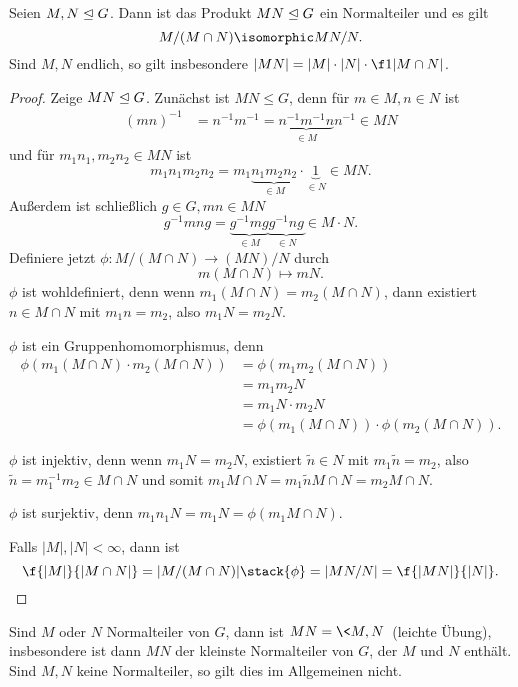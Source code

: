 \begin{lem} \label{2.5}
	Seien $M, N \trianglelefteq G$.
	Dann ist das Produkt $M N \trianglelefteq G$ ein Normalteiler und es gilt
	\[
		M / (M\cap N)
		\isomorphic
		MN / N.
	\]
	Sind $M, N$ endlich, so gilt insbesondere $|MN| = |M|\cdot|N| \cdot \f 1{|M \cap N|}$.
	\begin{proof}
		Zeige $M N \trianglelefteq G$.
		Zunächst ist $M N \le G$, denn für $m \in M, n \in N$ ist
		\begin{align*}
			(mn)^{-1} &= n^{-1} m^{-1}
			= \underbrace{n^{-1}m^{-1}n}_{\in M} n^{-1}
			\in MN
		\end{align*}
		und für $m_1n_1, m_2n_2 \in M N$ ist
		\[
			m_1 n_1 m_2 n_2
			= m_1 \underbrace{n_1 m_2 n_2}_{\in M} \cdot \underbrace{1}_{\in N}
			\in M N.
		\]
		Außerdem ist schließlich $g \in G, mn \in MN$
		\[
			g^{-1} mn g
			= \underbrace{g^{-1} m g}_{\in M} \underbrace{g^{-1} n g}_{\in N}
			\in M \cdot N.
		\]
		Definiere jetzt $\phi: M / (M \cap N) \to (M N) / N$ durch
		\[
			m(M\cap N) \mapsto mN.
		\]
		$\phi$ ist wohldefiniert, denn wenn $m_1 (M \cap N) = m_2 (M \cap N)$, dann existiert $n \in M \cap N$ mit $m_1 n = m_2$, also $m_1 N = m_2 N$.

		$\phi$ ist ein Gruppenhomomorphismus, denn
		\begin{align*}
			\phi(m_1 (M\cap N) \cdot m_2 (M \cap N))
			&= \phi(m_1m_2(M\cap N)) \\
			&= m_1 m_2 N \\
			&= m_1N \cdot m_2 N \\
			&= \phi(m_1 (M\cap N)) \cdot \phi(m_2 (M\cap N)).
		\end{align*}

		$\phi$ ist injektiv, denn wenn $m_1 N = m_2 N$, existiert $\tilde n \in N$ mit $m_1 \tilde n = m_2$, also $\tilde n = m_1^{-1} m_2 \in M \cap N$ und somit $m_1 M\cap N = m_1 \tilde n M\cap N = m_2 M \cap N$.

		$\phi$ ist surjektiv, denn $m_1 n_1 N = m_1 N = \phi(m_1 M\cap N)$.

		Falls $|M|, |N| < \infty$, dann ist
		\[
			\f {|M|}{|M \cap N|}
			= |M / (M\cap N)|
			\stack{\phi}= |MN / N|
			=  \f {|MN|}{|N|}.
		\]
	\end{proof}
\end{lem}

\begin{nt*}
	Sind $M$ oder $N$ Normalteiler von $G$, dann ist $M N = \<M, N\>$ (leichte Übung), insbesondere ist dann $M N$ der kleinste Normalteiler von $G$, der $M$ und $N$ enthält.
	Sind $M, N$ keine Normalteiler, so gilt dies im Allgemeinen nicht.
\end{nt*}

